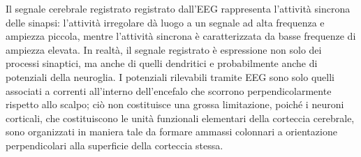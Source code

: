 \documentclass{report}
\numberwithin{equation}{section}
\numberwithin{figure}{section}
\begin{document}
Il segnale cerebrale registrato registrato dall'EEG rappresenta l'attività sincrona delle sinapsi: l'attività irregolare dà luogo a un segnale ad alta frequenza e ampiezza piccola, mentre l'attività sincrona è caratterizzata da basse frequenze di ampiezza elevata. In realtà, il segnale registrato è espressione non solo dei processi sinaptici, ma anche di quelli dendritici e probabilmente anche di potenziali della neuroglia. I potenziali rilevabili tramite EEG sono solo quelli associati a correnti all'interno dell'encefalo che scorrono perpendicolarmente rispetto allo scalpo; ciò non costituisce una grossa limitazione, poiché i neuroni corticali, che costituiscono le unità funzionali elementari della corteccia cerebrale, sono organizzati in maniera tale da formare ammassi colonnari a orientazione perpendicolari alla superficie della corteccia stessa.
\end{document}
